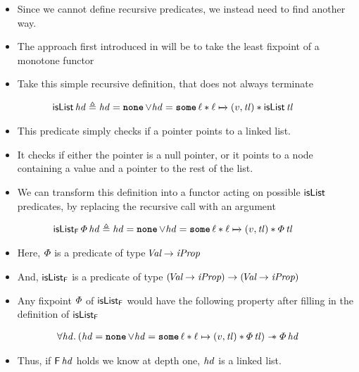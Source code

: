 \documentclass[thesis.tex]{subfiles}
\begin{document}
\begin{itemize}
    \item Since we cannot define recursive predicates, we instead need to find another way.
    \item The approach first introduced in \cite{?} will be to take the least fixpoint of a monotone functor
    \item Take this simple recursive definition, that does not always terminate
\end{itemize}
\begin{align*}
    \textlog{isList}\, \langv{hd} & \eqdef \langv{hd} = \None \lor \langv{hd} = \Some \loc * \loc\fmapsto(\val,\langv{tl}) * \textlog{isList}\, \langv{tl}
\end{align*}
\begin{itemize}
    \item This predicate simply checks if a pointer points to a linked list.
    \item It checks if either the pointer is a null pointer, or it points to a node containing a value and a pointer to the rest of the list.
    \item We can transform this definition into a functor acting on possible $\textsf{\upshape isList}$ predicates, by replacing the recursive call with an argument 
\end{itemize}
\begin{align*}
    \textlog{isList}_\hopred\, \pred\, \langv{hd} & \eqdef \langv{hd} = \None \lor \langv{hd} = \Some \loc * \loc\fmapsto(\val,\langv{tl}) * \pred\, \langv{tl}
\end{align*}
\begin{itemize}
    \item Here, $\varPhi$ is a predicate of type $\kern-0.2em\textit{Val} \to \textit{iProp}$
    \item And, $\textsf{\upshape isList}_{\textsf{\upshape F}}$ is a predicate of type $(\kern-0.2em\textit{Val} \to \textit{iProp}) \to (\kern-0.2em\textit{Val} \to \textit{iProp})$
    \item Any fixpoint $\varPhi$ of $\textsf{\upshape isList}_{\textsf{\upshape F}}$ would have the following property after filling in the definition of $\textsf{\upshape isList}_{\textsf{\upshape F}}$
\end{itemize}
\begin{align*}
    \All\langv{hd}. (\langv{hd} = \None \lor \langv{hd} = \Some \loc * \loc\fmapsto(\val,\langv{tl}) * \pred\, \langv{tl}) \wand \pred\, \langv{hd}
\end{align*}
\begin{itemize}
    \item Thus, if $\textsf{\upshape F}\, \mathit{hd}$ holds we know at depth one, $\mathit{hd}$ is a linked list.
\end{itemize}
\end{document}
